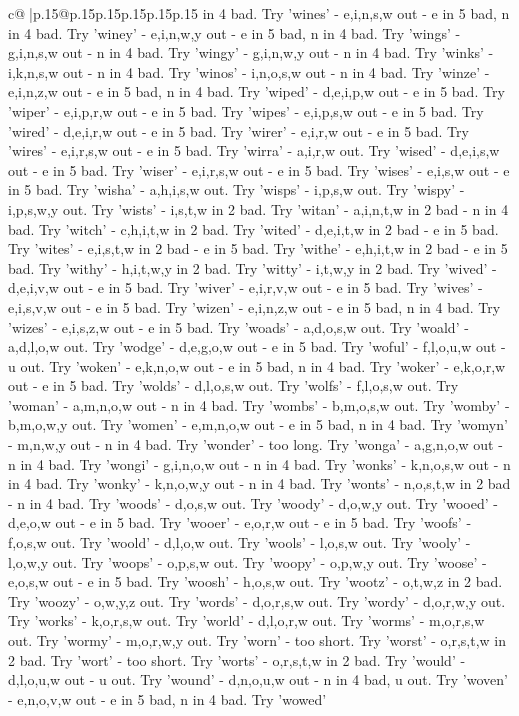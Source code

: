 \documentclass{article}
\begin{document}
{\begin{supertabular}{c@{$\;$}|p{.15\linewidth}@{}p{.15\linewidth}p{.15\linewidth}p{.15\linewidth}p{.15\linewidth}p{.15\linewidth}}
{{{in 4 bad. Try 'wines' {-} e,i,n,s,w out {-} e in 5 bad, n in 4 bad. Try 'winey' {-} e,i,n,w,y out {-} e in 5 bad, n in 4 bad. Try 'wings' {-} g,i,n,s,w out {-} n in 4 bad. Try 'wingy' {-} g,i,n,w,y out {-} n in 4 bad. Try 'winks' {-} i,k,n,s,w out {-} n in 4 bad. Try 'winos' {-} i,n,o,s,w out {-} n in 4 bad. Try 'winze' {-} e,i,n,z,w out {-} e in 5 bad, n in 4 bad. Try 'wiped' {-} d,e,i,p,w out {-} e in 5 bad. Try 'wiper' {-} e,i,p,r,w out {-} e in 5 bad. Try 'wipes' {-} e,i,p,s,w out {-} e in 5 bad. Try 'wired' {-} d,e,i,r,w out {-} e in 5 bad. Try 'wirer' {-} e,i,r,w out {-} e in 5 bad. Try 'wires' {-} e,i,r,s,w out {-} e in 5 bad. Try 'wirra' {-} a,i,r,w out. Try 'wised' {-} d,e,i,s,w out {-} e in 5 bad. Try 'wiser' {-} e,i,r,s,w out {-} e in 5 bad. Try 'wises' {-} e,i,s,w out {-} e in 5 bad. Try 'wisha' {-} a,h,i,s,w out. Try 'wisps' {-} i,p,s,w out. Try 'wispy' {-} i,p,s,w,y out. Try 'wists' {-} i,s,t,w in 2 bad. Try 'witan' {-} a,i,n,t,w in 2 bad {-} n in 4 bad. Try 'witch' {-} c,h,i,t,w in 2 bad. Try 'wited' {-} d,e,i,t,w in 2 bad {-} e in 5 bad. Try 'wites' {-} e,i,s,t,w in 2 bad {-} e in 5 bad. Try 'withe' {-} e,h,i,t,w in 2 bad {-} e in 5 bad. Try 'withy' {-} h,i,t,w,y in 2 bad. Try 'witty' {-} i,t,w,y in 2 bad. Try 'wived' {-} d,e,i,v,w out {-} e in 5 bad. Try 'wiver' {-} e,i,r,v,w out {-} e in 5 bad. Try 'wives' {-} e,i,s,v,w out {-} e in 5 bad. Try 'wizen' {-} e,i,n,z,w out {-} e in 5 bad, n in 4 bad. Try 'wizes' {-} e,i,s,z,w out {-} e in 5 bad. Try 'woads' {-} a,d,o,s,w out. Try 'woald' {-} a,d,l,o,w out. Try 'wodge' {-} d,e,g,o,w out {-} e in 5 bad. Try 'woful' {-} f,l,o,u,w out {-} u out. Try 'woken' {-} e,k,n,o,w out {-} e in 5 bad, n in 4 bad. Try 'woker' {-} e,k,o,r,w out {-} e in 5 bad. Try 'wolds' {-} d,l,o,s,w out. Try 'wolfs' {-} f,l,o,s,w out. Try 'woman' {-} a,m,n,o,w out {-} n in 4 bad. Try 'wombs' {-} b,m,o,s,w out. Try 'womby' {-} b,m,o,w,y out. Try 'women' {-} e,m,n,o,w out {-} e in 5 bad, n in 4 bad. Try 'womyn' {-} m,n,w,y out {-} n in 4 bad. Try 'wonder' {-} too long. Try 'wonga' {-} a,g,n,o,w out {-} n in 4 bad. Try 'wongi' {-} g,i,n,o,w out {-} n in 4 bad. Try 'wonks' {-} k,n,o,s,w out {-} n in 4 bad. Try 'wonky' {-} k,n,o,w,y out {-} n in 4 bad. Try 'wonts' {-} n,o,s,t,w in 2 bad {-} n in 4 bad. Try 'woods' {-} d,o,s,w out. Try 'woody' {-} d,o,w,y out. Try 'wooed' {-} d,e,o,w out {-} e in 5 bad. Try 'wooer' {-} e,o,r,w out {-} e in 5 bad. Try 'woofs' {-} f,o,s,w out. Try 'woold' {-} d,l,o,w out. Try 'wools' {-} l,o,s,w out. Try 'wooly' {-} l,o,w,y out. Try 'woops' {-} o,p,s,w out. Try 'woopy' {-} o,p,w,y out. Try 'woose' {-} e,o,s,w out {-} e in 5 bad. Try 'woosh' {-} h,o,s,w out. Try 'wootz' {-} o,t,w,z in 2 bad. Try 'woozy' {-} o,w,y,z out. Try 'words' {-} d,o,r,s,w out. Try 'wordy' {-} d,o,r,w,y out. Try 'works' {-} k,o,r,s,w out. Try 'world' {-} d,l,o,r,w out. Try 'worms' {-} m,o,r,s,w out. Try 'wormy' {-} m,o,r,w,y out. Try 'worn' {-} too short. Try 'worst' {-} o,r,s,t,w in 2 bad. Try 'wort' {-} too short. Try 'worts' {-} o,r,s,t,w in 2 bad. Try 'would' {-} d,l,o,u,w out {-} u out. Try 'wound' {-} d,n,o,u,w out {-} n in 4 bad, u out. Try 'woven' {-} e,n,o,v,w out {-} e in 5 bad, n in 4 bad. Try 'wowed' }}}
\end{supertabular}}
\end{document}
